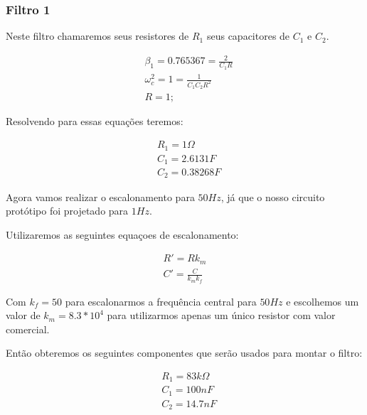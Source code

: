 \documentclass[12pt,twoside, a4paper, twocolumn]{article}
\begin{document}
\subsubsection{Filtro 1}


Neste filtro chamaremos seus resistores de $R_1$ seus capacitores de $C_1$ e $C_2$.


\begin{equation}
    \begin{aligned}
         & \beta_1 = 0.765367 = \frac{2}{C_1 R}   \\
         & \omega_c^2 = 1 = \frac{1}{C_1 C_2 R^2} \\
         & R = 1;
    \end{aligned}
\end{equation}


Resolvendo para essas equações teremos:


\begin{equation}
    \begin{aligned}
         & R_1 = 1 \varOmega \\
         & C_1 = 2.6131 F    \\
         & C_2 = 0.38268 F
    \end{aligned}
\end{equation}


Agora vamos realizar o escalonamento para $50Hz$, já que o nosso circuito protótipo foi projetado para $1Hz$.


Utilizaremos as seguintes equaçoes de escalonamento:


\begin{equation}
    \begin{aligned}
        R' = R  k_m \\
        C' = \frac{C}{k_m k_f}
    \end{aligned}
\end{equation}


Com $k_f = 50$ para escalonarmos a frequência central para $50Hz$ e escolhemos um valor de $k_m = 8.3 * 10^4$ para utilizarmos apenas um único resistor com valor comercial.


Então obteremos os seguintes componentes que serão usados para montar o filtro:


\begin{equation}
    \begin{aligned}
         & R_1 = 83k \varOmega \\
         & C_1 = 100 nF        \\
         & C_2 = 14.7 nF
    \end{aligned}
\end{equation}
\end{document}
